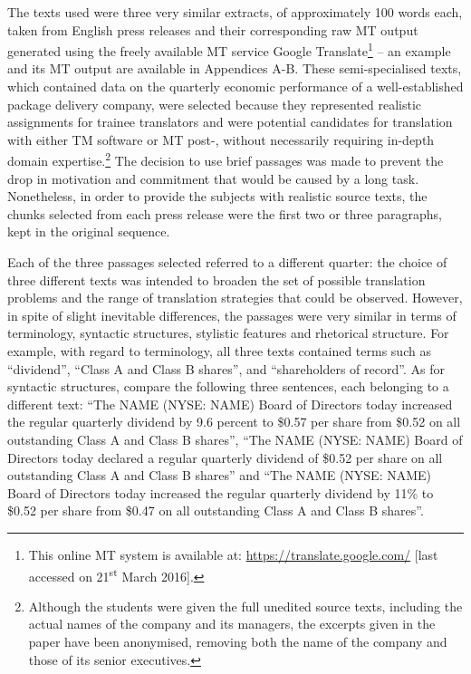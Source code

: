 \documentclass[output=paper]{LSP/langsci}
\begin{document}
The texts used were three very similar extracts, of approximately 100 words each, taken from English press releases and their corresponding  raw MT output generated using the freely available MT service Google Translate\footnote{This online MT system is available at: \url{https://translate.google.com/} [last accessed on 21\textsuperscript{st} March 2016].} -- an example and its MT output are available in Appendices A-B. These semi-specialised texts, which contained data on the quarterly economic performance of a well-established package delivery company, were selected because they represented realistic assignments for trainee translators and were potential candidates for translation with either TM software or MT post-, without necessarily requiring in-depth domain expertise.\footnote{Although the students were given the full unedited source texts, including the actual names of the company and its managers, the excerpts given in the paper have been anonymised, removing both the name of the company and those of its senior executives.} The decision to use brief passages was made to prevent the drop in motivation and commitment that would be caused by a long task. Nonetheless, in order to provide the subjects with realistic source texts, the chunks selected from each press release were the first two or three paragraphs, kept in the original sequence.


Each of the three passages selected referred to a different quarter: the choice of three different texts was intended to broaden the set of possible translation problems and the range of translation strategies that could be observed. However, in spite of slight inevitable differences, the passages were very similar in terms of terminology, syntactic structures, stylistic features and rhetorical structure. For example, with regard to terminology, all three texts contained terms such as ``dividend'', ``Class A and Class B shares'', and ``shareholders of record''. As for syntactic structures, compare the following three sentences, each belonging to a different text: ``The NAME (NYSE: NAME) Board of Directors today increased the regular quarterly dividend by 9.6 percent to \$0.57 per share from \$0.52 on all outstanding Class A and Class B shares'', ``The NAME (NYSE: NAME) Board of Directors today declared a regular quarterly dividend of \$0.52 per share on all outstanding Class A and Class B shares'' and ``The NAME (NYSE: NAME) Board of Directors today increased the regular quarterly dividend by 11\% to \$0.52 per share from \$0.47 on all outstanding Class A and Class B shares''.
\end{document}
